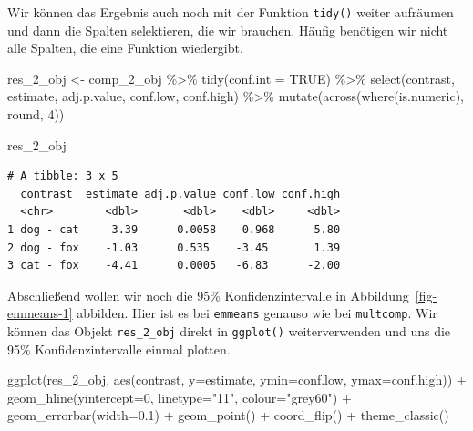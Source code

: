 \documentclass[
  letterpaper,
]{scrbook}
\newenvironment{Shaded}{\begin{snugshade}}{\end{snugshade}}
\newcommand{\AttributeTok}[1]{\textcolor[rgb]{0.40,0.45,0.13}{#1}}
\newcommand{\ConstantTok}[1]{\textcolor[rgb]{0.56,0.35,0.01}{#1}}
\newcommand{\DecValTok}[1]{\textcolor[rgb]{0.68,0.00,0.00}{#1}}
\newcommand{\FloatTok}[1]{\textcolor[rgb]{0.68,0.00,0.00}{#1}}
\newcommand{\FunctionTok}[1]{\textcolor[rgb]{0.28,0.35,0.67}{#1}}
\newcommand{\NormalTok}[1]{\textcolor[rgb]{0.00,0.23,0.31}{#1}}
\newcommand{\OtherTok}[1]{\textcolor[rgb]{0.00,0.23,0.31}{#1}}
\newcommand{\SpecialCharTok}[1]{\textcolor[rgb]{0.37,0.37,0.37}{#1}}
\newcommand{\StringTok}[1]{\textcolor[rgb]{0.13,0.47,0.30}{#1}}
\begin{document}
Wir können das Ergebnis auch noch mit der Funktion \texttt{tidy()}
weiter aufräumen und dann die Spalten selektieren, die wir brauchen.
Häufig benötigen wir nicht alle Spalten, die eine Funktion wiedergibt.

\begin{Shaded}
\begin{Highlighting}[]
\NormalTok{res\_2\_obj }\OtherTok{\textless{}{-}}\NormalTok{ comp\_2\_obj }\SpecialCharTok{\%\textgreater{}\%} 
  \FunctionTok{tidy}\NormalTok{(}\AttributeTok{conf.int =} \ConstantTok{TRUE}\NormalTok{) }\SpecialCharTok{\%\textgreater{}\%} 
  \FunctionTok{select}\NormalTok{(contrast, estimate, adj.p.value, conf.low, conf.high) }\SpecialCharTok{\%\textgreater{}\%} 
  \FunctionTok{mutate}\NormalTok{(}\FunctionTok{across}\NormalTok{(}\FunctionTok{where}\NormalTok{(is.numeric), round, }\DecValTok{4}\NormalTok{))}

\NormalTok{res\_2\_obj}
\end{Highlighting}
\end{Shaded}

\begin{verbatim}
# A tibble: 3 x 5
  contrast  estimate adj.p.value conf.low conf.high
  <chr>        <dbl>       <dbl>    <dbl>     <dbl>
1 dog - cat     3.39      0.0058    0.968      5.80
2 dog - fox    -1.03      0.535    -3.45       1.39
3 cat - fox    -4.41      0.0005   -6.83      -2.00
\end{verbatim}

Abschließend wollen wir noch die 95\% Konfidenzintervalle in
Abbildung~\ref{fig-emmeans-1} abbilden. Hier ist es bei \texttt{emmeans}
genauso wie bei \texttt{multcomp}. Wir können das Objekt
\texttt{res\_2\_obj} direkt in \texttt{ggplot()} weiterverwenden und uns
die 95\% Konfidenzintervalle einmal plotten.

\begin{Shaded}
\begin{Highlighting}[]
  \FunctionTok{ggplot}\NormalTok{(res\_2\_obj, }\FunctionTok{aes}\NormalTok{(contrast, }\AttributeTok{y=}\NormalTok{estimate, }\AttributeTok{ymin=}\NormalTok{conf.low, }\AttributeTok{ymax=}\NormalTok{conf.high)) }\SpecialCharTok{+}
    \FunctionTok{geom\_hline}\NormalTok{(}\AttributeTok{yintercept=}\DecValTok{0}\NormalTok{, }\AttributeTok{linetype=}\StringTok{"11"}\NormalTok{, }\AttributeTok{colour=}\StringTok{"grey60"}\NormalTok{) }\SpecialCharTok{+}
    \FunctionTok{geom\_errorbar}\NormalTok{(}\AttributeTok{width=}\FloatTok{0.1}\NormalTok{) }\SpecialCharTok{+} 
    \FunctionTok{geom\_point}\NormalTok{() }\SpecialCharTok{+}
    \FunctionTok{coord\_flip}\NormalTok{() }\SpecialCharTok{+}
    \FunctionTok{theme\_classic}\NormalTok{()}
\end{Highlighting}
\end{Shaded}
\end{document}
